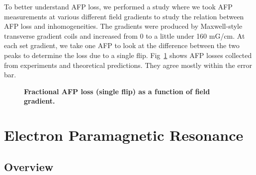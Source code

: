 To better understand AFP loss, we performed a study where we took AFP measurements at various different field gradients to study the relation between AFP loss and inhomogeneities. The gradients were produced by Maxwell-style transverse gradient coils and increased from 0 to a little under 160 mG/cm. At each set gradient, we take one AFP to look at the difference between the two peaks to determine the loss due to a single flip. Fig~\ref{AFPLossvsGradient} shows AFP losses collected from experiments and theoretical predictions. They agree mostly within the error bar.

\begin{figure}[H]
	\centering
	\caption{{\bf Fractional AFP loss (single flip) as a function of field gradient.}}
	\label{AFPLossvsGradient}
\end{figure}

\section{Electron Paramagnetic Resonance}

\subsection{Overview}

